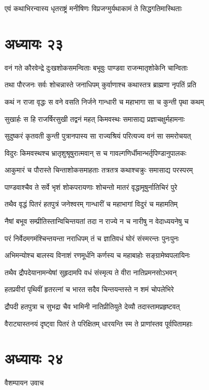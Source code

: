 \twolineshloka
{एवं कथाभिरन्वास्य धृतराष्ट्रं मनीषिणः}
{विप्रजग्मुर्यथाकामं ते सिद्धगतिमास्थिताः}


\chapter{अध्यायः २३}
\twolineshloka
{वनं गते कौरवेन्द्रे दुःखशोकसमन्विताः}
{बभूवुः पाण्डवा राजन्मातृशोकेनि चान्विताः}


\twolineshloka
{तथा पौरजनः सर्वः शोचन्नास्ते जनाधिपम्}
{कुर्वाणाश्च कथास्तत्र ब्राह्मणा नृपतिं प्रति}


\twolineshloka
{कथं न राजा वृद्धः स वने वसति निर्जने}
{गान्धारी च महाभागा सा च कुन्ती पृथा कथम्}


\twolineshloka
{सुखार्हः स हि राजर्षिरसुखी तद्वनं महत्}
{किमवस्थः समासाद्य प्रज्ञाचक्षुर्महामनाः}


\twolineshloka
{सुदुष्करं कृतवती कुन्ती पुत्रानपास्य सा}
{राज्यश्रियं परित्यज्य वनं सा समरोचयत्}


\twolineshloka
{विदुरः किमवस्थश्च भ्रातृशुश्रूषुरात्मवान्}
{स च गावल्गणिर्धीमान्भर्तृपिण्डानुपालकः}


\twolineshloka
{आकुमारं च पौरास्ते चिन्ताशोकसमाहताः}
{तत्रतत्र कथाश्चक्रुः समासाद्य परस्परम्}


\twolineshloka
{पाण्डवाश्चैव ते सर्वे भृशं शोकपरायणाः}
{शोचन्तो मातरं वृद्धामूषुर्नातिचिरं पुरे}


\twolineshloka
{तथैव वृद्धं पितरं हतपुत्रं जनेश्वरम्}
{गान्धारीं च महाभागां विदुरं च महामतिम्}


\twolineshloka
{नैषां बभूव सम्प्रीतिस्तान्विचिन्तयतां तदा}
{न राज्ये न च नारीषु न वेदाध्ययनेषु च}


\twolineshloka
{परं निर्वेदमगमंश्चिन्तयन्ता नराधिपम्}
{तं च ज्ञातिवधं घोरं संस्मरन्तः पुनःपुनः}


\twolineshloka
{अभिमन्योश्च बालस्य विनाशं रणमूर्धनि}
{कर्णस्य च महाबाहोः सङ्ग्रामेष्वपलायिनः}


\twolineshloka
{तथैव द्रौपदेयानामन्येषां सुहृदामपि}
{वधं संस्मृत्य ते वीरा नातिप्रमनसोऽभवन्}


\twolineshloka
{हतप्रवीरां पृथिवीं हृतरत्नां च भारत}
{सदैव चिन्तयन्तस्ते न शमं चोपलेभिरे}


\twolineshloka
{द्रौपदी हतपुत्रा च सुभद्रा चैव भामिनी}
{नातिप्रीतियुते देव्यौ तदास्तामप्रहृष्टवत्}


\twolineshloka
{वैराट्यास्तनयं दृष्ट्वा पितरं ते परिक्षितम्}
{धारयन्ति स्म ते प्राणांस्तव पूर्वपितामहाः}


\chapter{अध्यायः २४}
\twolineshloka
{वैशम्पायन उवाच}
{}


